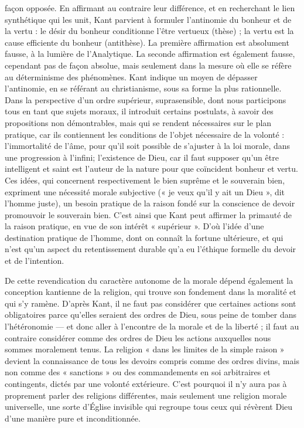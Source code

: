 façon opposée. En affirmant au contraire
leur différence, et en recherchant le lien
synthétique qui les unit, Kant parvient à
formuler l’antinomie du bonheur et de la
vertu : le désir du bonheur conditionne
l’être vertueux (thèse) ; la vertu est la
cause efficiente du bonheur (antithèse).
La première affirmation est absolument
fausse, à la lumière de l’Analytique. La
seconde affirmation est également fausse,
cependant pas de façon absolue, mais seulement
dans la mesure où elle se réfère
au déterminisme des phénomènes. Kant
indique un moyen de dépasser l’antinomie,
en se référant au christianisme, sous
sa forme la plus rationnelle. Dans la perspective
d’un ordre supérieur, suprasensible,
dont nous participons tous en tant
que sujets moraux, il introduit certains
postulats, à savoir des propositions non
démontrables, mais qui se rendent nécessaires
sur le plan pratique, car ils contiennent
les conditions de l’objet nécessaire
de la volonté : l’immortalité de l’âme,
pour qu’il soit possible de s’ajuster à la loi
morale, dans une progression à l'infini;
l'existence de Dieu, car il faut supposer
qu’un être intelligent et saint est l’auteur
de la nature pour que coïncident bonheur
et vertu. Ces idées, qui concernent respectivement
le bien suprême et le souverain
bien, expriment une nécessité morale subjective
(« je veux qu'il y ait un Dieu », dit
l’homme juste), un besoin pratique de la
raison fondé sur la conscience de devoir
promouvoir le souverain bien. C’est ainsi
que Kant peut affirmer la primauté de la
raison pratique, en vue de son intérêt
« supérieur ». D'où l’idée d’une destination
pratique de l’homme, dont on
connaît la fortune ultérieure, et qui n’est
qu’un aspect du retentissement durable
qu'a eu l'éthique formelle du devoir et de
l'intention.

De cette revendication du caractère
autonome de la morale dépend également
la conception kantienne de la religion, qui
trouve son fondement dans la moralité et
qui s’y ramène. D’après Kant, il ne faut
pas considérer que certaines actions sont
obligatoires parce qu’elles seraient des
ordres de Dieu, sous peine de tomber
dans l’hétéronomie — et donc aller à l’encontre
de la morale et de la liberté ; il faut
au contraire considérer comme des ordres
de Dieu les actions auxquelles nous
sommes moralement tenus. La religion
« dans les limites de la simple raison »
devient la connaissance de tous les
devoirs compris comme des ordres divins,
mais non comme des « sanctions » ou des
commandements en soi arbitraires et
contingents, dictés par une volonté extérieure.
C’est pourquoi il n’y aura pas à
proprement parler des religions différentes,
mais seulement une religion
morale universelle, une sorte d'Église
invisible qui regroupe tous ceux qui révèrent
Dieu d’une manière pure et inconditionnée.

